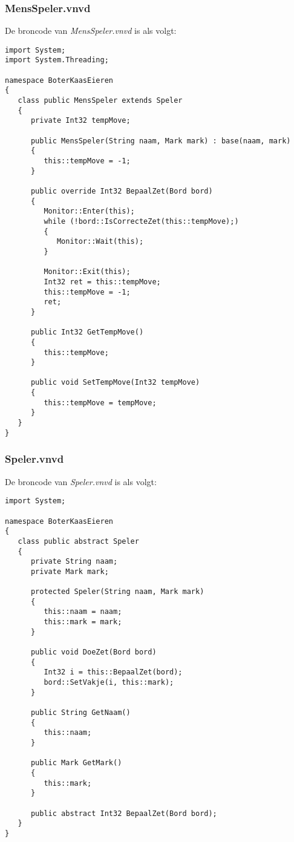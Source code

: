 \subsubsection{MensSpeler.vnvd}
De broncode van \textit{MensSpeler.vnvd} is als volgt:

\begin{lstlisting}
import System;
import System.Threading;

namespace BoterKaasEieren
{
   class public MensSpeler extends Speler
   {
      private Int32 tempMove;
      
      public MensSpeler(String naam, Mark mark) : base(naam, mark)
      {
         this::tempMove = -1;
      }
      
      public override Int32 BepaalZet(Bord bord)
      {
         Monitor::Enter(this);
         while (!bord::IsCorrecteZet(this::tempMove);)
         {
            Monitor::Wait(this);
         }
         
         Monitor::Exit(this);
         Int32 ret = this::tempMove;
         this::tempMove = -1;
         ret;
      }
      
      public Int32 GetTempMove()
      {
         this::tempMove;
      }
      
      public void SetTempMove(Int32 tempMove)
      {
         this::tempMove = tempMove;
      }
   }
}
\end{lstlisting}

\subsubsection{Speler.vnvd}
De broncode van \textit{Speler.vnvd} is als volgt:

\begin{lstlisting}
import System;

namespace BoterKaasEieren
{
   class public abstract Speler
   {
      private String naam;
      private Mark mark;
      
      protected Speler(String naam, Mark mark)
      {
         this::naam = naam;
         this::mark = mark;
      }
      
      public void DoeZet(Bord bord)
      {
         Int32 i = this::BepaalZet(bord);
         bord::SetVakje(i, this::mark);
      }
      
      public String GetNaam()
      {
         this::naam;
      }
      
      public Mark GetMark()
      {
         this::mark;
      }
      
      public abstract Int32 BepaalZet(Bord bord);
   }
}
\end{lstlisting}

